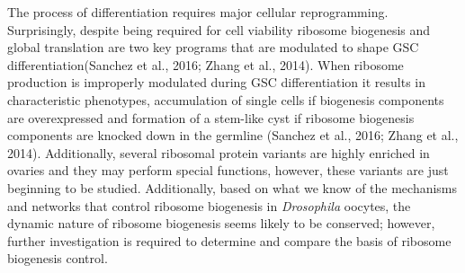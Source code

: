 \documentclass[12pt,oneside]{reedthesis}
\begin{document}
The process of differentiation requires major cellular reprogramming.
Surprisingly, despite being required for cell viability ribosome
biogenesis and global translation are two key programs that are
modulated to shape GSC differentiation(Sanchez et al., 2016; Zhang et al., 2014).
When ribosome production is improperly modulated during GSC
differentiation it results in characteristic phenotypes, accumulation of
single cells if biogenesis components are overexpressed and formation of
a stem-like cyst if ribosome biogenesis components are knocked down in
the germline (Sanchez et al., 2016; Zhang et al., 2014). Additionally, several
ribosomal protein variants are highly enriched in ovaries and they may
perform special functions, however, these variants are just beginning to
be studied. Additionally, based on what we know of the mechanisms and
networks that control ribosome biogenesis in \emph{Drosophila} oocytes, the
dynamic nature of ribosome biogenesis seems likely to be conserved;
however, further investigation is required to determine and compare the
basis of ribosome biogenesis control.
\end{document}
